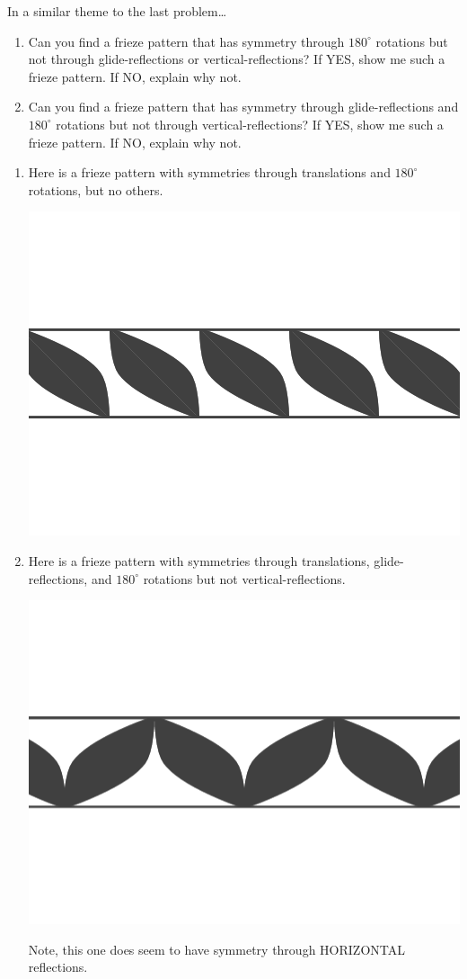 \documentclass[noauthor,nooutcomes,hints,handout]{ximera}
\begin{document}
\begin{question}
  In a similar theme to the last problem\dots 
  \begin{enumerate}
    \item Can you find a frieze pattern that has symmetry through
      $180^\circ$ rotations but not through glide-reflections or
      vertical-reflections? If YES, show me such a frieze pattern. If
      NO, explain why not.
  
    \item Can you find a frieze pattern that has symmetry through
      glide-reflections and $180^\circ$ rotations but not through
      vertical-reflections? If YES, show me such a frieze pattern. If
      NO, explain why not.
  \end{enumerate}
  \begin{freeResponse}
    \begin{enumerate}
    \item Here is a frieze pattern with symmetries through
      translations and $180^\circ$ rotations, but no others.
      \begin{center}
        \includegraphics[width=.6\textwidth]{ansR.png}
      \end{center}
    \item Here is a frieze pattern with symmetries through
      translations, glide-reflections, and $180^\circ$ rotations but
      not vertical-reflections.
        \begin{center}
          \includegraphics[width=.6\textwidth]{ansRGR.png}
        \end{center}
        Note, this one does seem to have symmetry through HORIZONTAL
        reflections.
    \end{enumerate}
  \end{freeResponse}
\end{question}
\end{document}
